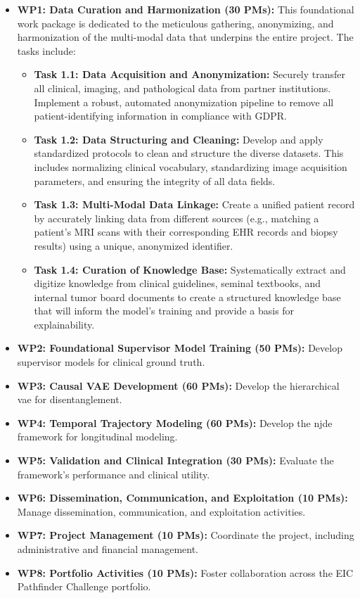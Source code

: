 \documentclass[11pt, a4paper]{article}
\begin{document}
\begin{itemize}
    \item \textbf{WP1: Data Curation and Harmonization (30 PMs):} This foundational work package is dedicated to the meticulous gathering, anonymizing, and harmonization of the multi-modal data that underpins the entire project. The tasks include:
    \begin{itemize}
        \item \textbf{Task 1.1: Data Acquisition and Anonymization:} Securely transfer all clinical, imaging, and pathological data from partner institutions. Implement a robust, automated anonymization pipeline to remove all patient-identifying information in compliance with GDPR.
        \item \textbf{Task 1.2: Data Structuring and Cleaning:} Develop and apply standardized protocols to clean and structure the diverse datasets. This includes normalizing clinical vocabulary, standardizing image acquisition parameters, and ensuring the integrity of all data fields.
        \item \textbf{Task 1.3: Multi-Modal Data Linkage:} Create a unified patient record by accurately linking data from different sources (e.g., matching a patient's MRI scans with their corresponding EHR records and biopsy results) using a unique, anonymized identifier.
        \item \textbf{Task 1.4: Curation of Knowledge Base:} Systematically extract and digitize knowledge from clinical guidelines, seminal textbooks, and internal tumor board documents to create a structured knowledge base that will inform the model's training and provide a basis for explainability.
    \end{itemize}
    \item \textbf{WP2: Foundational Supervisor Model Training (50 PMs):} Develop supervisor models for clinical ground truth.
    \item \textbf{WP3: Causal VAE Development (60 PMs):} Develop the hierarchical \gls{vae} for disentanglement.
    \item \textbf{WP4: Temporal Trajectory Modeling (60 PMs):} Develop the \gls{njde} framework for longitudinal modeling.
    \item \textbf{WP5: Validation and Clinical Integration (30 PMs):} Evaluate the framework's performance and clinical utility.
    \item \textbf{WP6: Dissemination, Communication, and Exploitation (10 PMs):} Manage dissemination, communication, and exploitation activities.
    \item \textbf{WP7: Project Management (10 PMs):} Coordinate the project, including administrative and financial management.
    \item \textbf{WP8: Portfolio Activities (10 PMs):} Foster collaboration across the EIC Pathfinder Challenge portfolio.
\end{itemize}
\end{document}
